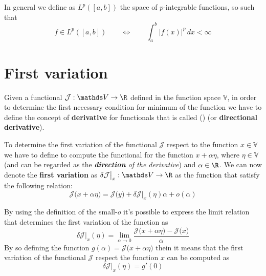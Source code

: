 In general we define as $L^p([a,b])$ the space of $p$-integrable functions, so such that
\[ f\in L^p([a,b])  \qquad \Leftrightarrow \qquad \int_a^b |f(x)|^p\, dx < \infty\]


\section{First variation}
	
	Given a functional $\mathcal J: \mathds V\rightarrow \R$ defined in the function space $\mathds V$, in order to determine the first necessary condition for minimum of the function we have to define the concept of \textbf{derivative} for functionals that is called ()  (or \textbf{directional derivative}).

	To determine the first variation of the functional $\mathcal J$ respect to the function $x\in \mathds V$ we have to define to compute the functional for the function $x + \alpha \eta$, where $\eta \in \mathds V$ (and can be regarded as the \textit{\textbf{direction} of the derivative}) and $\alpha \in \R$. We can now denote the \textbf{first variation} as $\delta \mathcal J\big|_x:\mathds V\rightarrow \R$ as the function that satisfy the following relation:
	\begin{equation}
		\mathcal J\big(x + \alpha \eta\big) = \mathcal J\big(y\big) + \delta \mathcal J\big|_x(\eta)\alpha +  o(\alpha)
	\end{equation}
	
	By using the definition of the small-$o$ it's possible to express the limit relation that determines the first variation of the function as
	\begin{equation}
		\delta \mathcal J\big|_x (\eta) = \lim_{\alpha\rightarrow 0} \frac{\mathcal J\big(x + \alpha \eta\big) - \mathcal J\big(x\big)}{\alpha}
	\end{equation}
	By so defining the function $g(\alpha) = \mathcal J\big(x+ \alpha \eta \big)$	thein it means that the first variation of the functional $\mathcal J$ respect the function $x$ can be computed as
	\begin{equation} \label{eq:func:dirderivative}
		\delta \mathcal J\big|_x(\eta) = g'(0)
	\end{equation}
	
